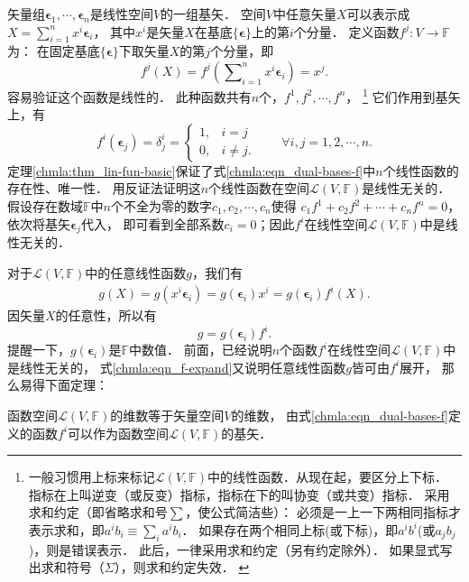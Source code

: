 矢量组$\boldsymbol{\epsilon}_1,\cdots,\boldsymbol{\epsilon}_n$是线性空间$V$的一组基矢．
空间$V$中任意矢量$X$可以表示成$X= \sum_{i=1}^{n} x^i \boldsymbol{\epsilon}_i$，
其中$x^i$是矢量$X$在基底$\{\boldsymbol{\epsilon}\}$上的第$i$个分量．
定义函数$f^j:V\to \mathbb{F}$为：
在固定基底$\{\boldsymbol{\epsilon}\}$下取矢量$X$的第$j$个分量，即
\begin{equation}\label{chmla:eqn_fjx}
    f^j(X)=f^j\left(\sum\nolimits_{i=1}^{n} x^i \boldsymbol{\epsilon}_i\right)=x^j .
\end{equation}
容易验证这个函数是线性的．
此种函数共有$n$个，$f^1,f^2,\cdots,f^n$，
{\footnote{一般习惯用上标来标记$\mathscr{L}(V,\mathbb{F})$中的线性函数．从现在起，要区分上下标．
        指标在上叫逆变（或反变）指标，指标在下的叫协变（或共变）指标．
        采用{\heiti 求和约定}（即省略求和号$\sum$，使公式简洁些）：
        必须是一上一下两相同指标才表示求和，即$a^i b_i \equiv \sum_{i}a^i b_i$．
        如果存在两个相同上标(或下标)，即$a^i b^i$(或$a_j b_j$)，则是错误表示．
        此后，一律采用求和约定（另有约定除外）．
        如果显式写出求和符号（$\Sigma$），则求和约定失效．
        \label{chmla:ft_einstein-sum}}}
它们作用到基矢上，有
\begin{equation} \label{chmla:eqn_dual-bases-f}
    f^i(\boldsymbol{\epsilon}_j) = \delta^i _j =
    \begin{cases}
        1,& i=j \\ 0, & i\neq j.
    \end{cases}
    \qquad \forall i,j = 1,2,\cdots,n.
\end{equation}
定理\ref{chmla:thm_lin-fun-basic}保证了式\eqref{chmla:eqn_dual-bases-f}中$n$个线性函数的存在性、唯一性．
用反证法证明这$n$个线性函数在空间$\mathscr{L}(V,\mathbb{F})$是线性无关的．
假设存在数域$\mathbb{F}$中$n$个不全为零的数字$c_1,c_2,\cdots,c_n$使得
$c_1 f^1 + c_2 f^2 + \cdots + c_n f^n =0$，依次将基矢$\boldsymbol{\epsilon}_j$代入，
即可看到全部系数$c_i=0$；因此$f^i$在线性空间$\mathscr{L}(V,\mathbb{F})$中是线性无关的．

对于$\mathscr{L}(V,\mathbb{F})$中的任意线性函数$g$，我们有
\begin{align*}
	g(X) = g(x^i \boldsymbol{\epsilon}_i) = g( \boldsymbol{\epsilon}_i)x^i
	=g( \boldsymbol{\epsilon}_i)f^i (X).
\end{align*}
因矢量$X$的任意性，所以有
    \begin{equation}\label{chmla:eqn_f-expand}
        g = g( \boldsymbol{\epsilon}_i)f^i.
    \end{equation}
提醒一下，$g( \boldsymbol{\epsilon}_i)$是$\mathbb{F}$中数值．
前面，已经说明$n$个函数$f^i$在线性空间$\mathscr{L}(V,\mathbb{F})$中是线性无关的，
式\eqref{chmla:eqn_f-expand}又说明任意线性函数$g$皆可由$f^i$展开，
那么易得下面定理：
\begin{theorem}
    函数空间$\mathscr{L}(V,\mathbb{F})$的维数等于矢量空间$V$的维数，
    由式\eqref{chmla:eqn_dual-bases-f}定义的函数$f^i$可以作为函数空间$\mathscr{L}(V,\mathbb{F})$的基矢．
\end{theorem}

